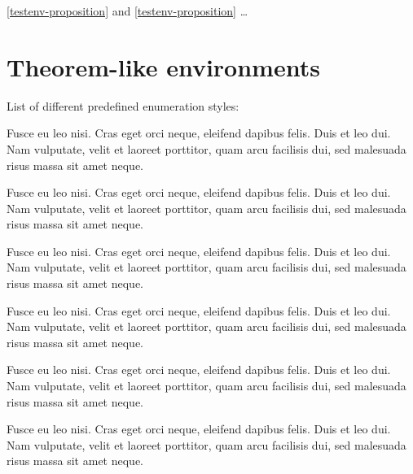 \documentclass[a4paper ,UKenglish  ,cleveref ,autoref ,thm-restate   ]{lipics-v2019}
\begin{document}
\cref{testenv-proposition} and \autoref{testenv-proposition} \ldots{}

\section{Theorem-like environments}

List of different predefined enumeration styles:

\begin{theorem}\label{testenv-theorem}
Fusce eu leo nisi. Cras eget orci neque, eleifend dapibus felis. Duis et leo dui. Nam vulputate, velit et laoreet porttitor, quam arcu facilisis dui, sed malesuada risus massa sit amet neque.
\end{theorem}

\begin{lemma}\label{testenv-lemma}
Fusce eu leo nisi. Cras eget orci neque, eleifend dapibus felis. Duis et leo dui. Nam vulputate, velit et laoreet porttitor, quam arcu facilisis dui, sed malesuada risus massa sit amet neque.
\end{lemma}

\begin{corollary}\label{testenv-corollary}
Fusce eu leo nisi. Cras eget orci neque, eleifend dapibus felis. Duis et leo dui. Nam vulputate, velit et laoreet porttitor, quam arcu facilisis dui, sed malesuada risus massa sit amet neque.
\end{corollary}

\begin{proposition}\label{testenv-proposition}
Fusce eu leo nisi. Cras eget orci neque, eleifend dapibus felis. Duis et leo dui. Nam vulputate, velit et laoreet porttitor, quam arcu facilisis dui, sed malesuada risus massa sit amet neque.
\end{proposition}

\begin{exercise}\label{testenv-exercise}
Fusce eu leo nisi. Cras eget orci neque, eleifend dapibus felis. Duis et leo dui. Nam vulputate, velit et laoreet porttitor, quam arcu facilisis dui, sed malesuada risus massa sit amet neque.
\end{exercise}

\begin{definition}\label{testenv-definition}
Fusce eu leo nisi. Cras eget orci neque, eleifend dapibus felis. Duis et leo dui. Nam vulputate, velit et laoreet porttitor, quam arcu facilisis dui, sed malesuada risus massa sit amet neque.
\end{definition}
\end{document}
